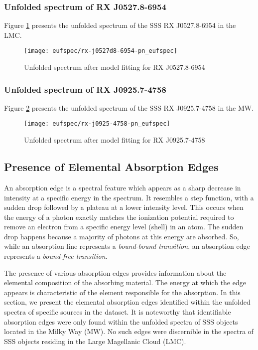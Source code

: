 			\newpage
			\subsubsection*{Unfolded spectrum of RX J0527.8-6954}
				Figure \ref{result:euf-rx-j0527} presents the unfolded spectrum of the SSS RX J0527.8-6954 in the LMC.
				\begin{figure}[h!]
					\centering
					\texttt{[image: eufspec/rx-j0527d8-6954-pn\_eufspec]}
					\caption{Unfolded spectrum after model fitting for RX J0527.8-6954}
					\label{result:euf-rx-j0527}
				\end{figure}
			
			\subsubsection*{Unfolded spectrum of RX J0925.7-4758}
				Figure \ref{result:euf-rx-j0925} presents the unfolded spectrum of the SSS RX J0925.7-4758 in the MW.
				\begin{figure}[h!]
					\centering
					\texttt{[image: eufspec/rx-j0925-4758-pn\_eufspec]}
					\caption{Unfolded spectrum after model fitting for RX J0925.7-4758}
					\label{result:euf-rx-j0925}
				\end{figure}
			
		
		\subsection{Presence of Elemental Absorption Edges}
			An absorption edge is a spectral feature which appears as a sharp decrease in intensity at a specific energy in the spectrum. It resembles a step function, with a sudden drop followed by a plateau at a lower intensity level. This occurs when the energy of a photon exactly matches the ionization potential required to remove an electron from a specific energy level (shell) in an atom. The sudden drop happens because a majority of photons at this energy are absorbed. So, while an absorption line represents a \textit{bound-bound transition}, an absorption edge represents a \textit{bound-free transition}.
			
			The presence of various absorption edges provides information about the elemental composition of the absorbing material. The energy at which the edge appears is characteristic of the element responsible for the absorption. In this section, we present the elemental absorption edges identified within the unfolded spectra of specific sources in the dataset. It is noteworthy that identifiable absorption edges were only found within the unfolded spectra of SSS objects located in the Milky Way (MW). No such edges were discernible in the spectra of SSS objects residing in the Large Magellanic Cloud (LMC).
		
